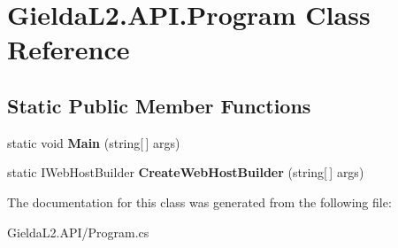 \hypertarget{class_gielda_l2_1_1_a_p_i_1_1_program}{}\section{Gielda\+L2.\+A\+P\+I.\+Program Class Reference}
\label{class_gielda_l2_1_1_a_p_i_1_1_program}
\subsection*{Static Public Member Functions}
\begin{DoxyCompactItemize}
\item 
\mbox{\label{class_gielda_l2_1_1_a_p_i_1_1_program_a4eae1b1a40be00d8d99ec85a7712d565}} 
static void {\bfseries Main} (string\mbox{[}$\,$\mbox{]} args)
\item 
\mbox{\label{class_gielda_l2_1_1_a_p_i_1_1_program_aed9c8df6403b1abe58e5db7d6bbb84d0}} 
static I\+Web\+Host\+Builder {\bfseries Create\+Web\+Host\+Builder} (string\mbox{[}$\,$\mbox{]} args)
\end{DoxyCompactItemize}


The documentation for this class was generated from the following file\+:\begin{DoxyCompactItemize}
\item 
Gielda\+L2.\+A\+P\+I/Program.\+cs\end{DoxyCompactItemize}
